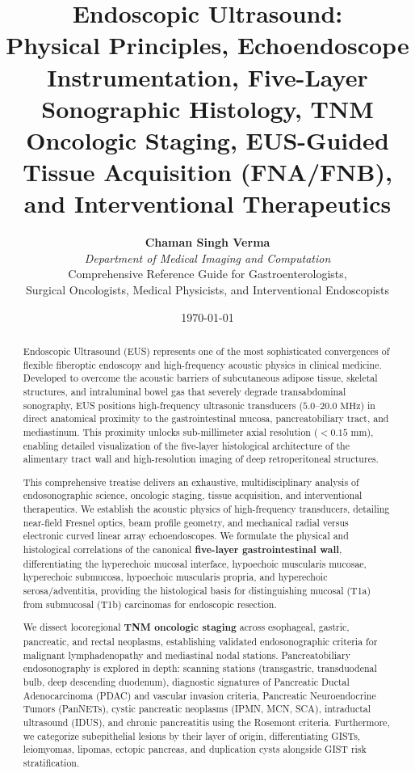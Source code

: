 \documentclass[11pt,a4paper]{article}
\title{\textbf{\huge Endoscopic Ultrasound:}\\[0.4em]
\Large Physical Principles, Echoendoscope Instrumentation, Five-Layer Sonographic Histology, TNM Oncologic Staging, EUS-Guided Tissue Acquisition (FNA/FNB), and Interventional Therapeutics}
\author{\textbf{Chaman Singh Verma} \\
\textit{Department of Medical Imaging and Computation} \\
\small \textsf{Comprehensive Reference Guide for Gastroenterologists,}\\[0.2em]
\small \textsf{Surgical Oncologists, Medical Physicists, and Interventional Endoscopists}}
\date{\today}
\begin{document}
\maketitle

\begin{abstract}
Endoscopic Ultrasound (EUS) represents one of the most sophisticated convergences of flexible fiberoptic endoscopy and high-frequency acoustic physics in clinical medicine. Developed to overcome the acoustic barriers of subcutaneous adipose tissue, skeletal structures, and intraluminal bowel gas that severely degrade transabdominal sonography, EUS positions high-frequency ultrasonic transducers ($5.0\text{--}20.0\text{ MHz}$) in direct anatomical proximity to the gastrointestinal mucosa, pancreatobiliary tract, and mediastinum. This proximity unlocks sub-millimeter axial resolution ($< 0.15\text{ mm}$), enabling detailed visualization of the five-layer histological architecture of the alimentary tract wall and high-resolution imaging of deep retroperitoneal structures.

This comprehensive treatise delivers an exhaustive, multidisciplinary analysis of endosonographic science, oncologic staging, tissue acquisition, and interventional therapeutics. We establish the acoustic physics of high-frequency transducers, detailing near-field Fresnel optics, beam profile geometry, and mechanical radial versus electronic curved linear array echoendoscopes. We formulate the physical and histological correlations of the canonical \textbf{five-layer gastrointestinal wall}, differentiating the hyperechoic mucosal interface, hypoechoic muscularis mucosae, hyperechoic submucosa, hypoechoic muscularis propria, and hyperechoic serosa/adventitia, providing the histological basis for distinguishing mucosal (T1a) from submucosal (T1b) carcinomas for endoscopic resection.

We dissect locoregional \textbf{TNM oncologic staging} across esophageal, gastric, pancreatic, and rectal neoplasms, establishing validated endosonographic criteria for malignant lymphadenopathy and mediastinal nodal stations. Pancreatobiliary endosonography is explored in depth: scanning stations (transgastric, transduodenal bulb, deep descending duodenum), diagnostic signatures of Pancreatic Ductal Adenocarcinoma (PDAC) and vascular invasion criteria, Pancreatic Neuroendocrine Tumors (PanNETs), cystic pancreatic neoplasms (IPMN, MCN, SCA), intraductal ultrasound (IDUS), and chronic pancreatitis using the Rosemont criteria. Furthermore, we categorize subepithelial lesions by their layer of origin, differentiating GISTs, leiomyomas, lipomas, ectopic pancreas, and duplication cysts alongside GIST risk stratification.


\end{abstract}
\end{document}
